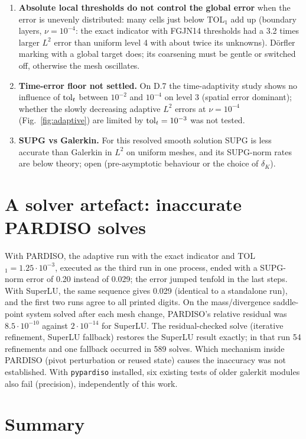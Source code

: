 \documentclass[11pt,a4paper]{article}
\newcommand{\code}[1]{\texttt{#1}}
\begin{document}
\begin{enumerate}
  level 6 in both norms with fewer unknowns (Sect.~\ref{sec:layers}).
\item \textbf{Absolute local thresholds do not control the global error} when the error is unevenly distributed: many cells
  just below TOL$_1$ add up (boundary layers, $\nu=10^{-4}$: the exact indicator with FGJN14 thresholds had a 3.2 times larger
  $L^2$ error than uniform level 4 with about twice its unknowns). D\"orfler marking with a global target does; its coarsening must be
  gentle or switched off, otherwise the mesh oscillates.
\item \textbf{Time-error floor not settled.} On D.7 the time-adaptivity study shows no influence of ${\rm tol}_t$ between
  $10^{-2}$ and $10^{-4}$ on level 3 (spatial error dominant); whether the slowly decreasing adaptive $L^2$ errors at
  $\nu=10^{-4}$ (Fig.~\ref{fig:adaptive}) are limited by ${\rm tol}_t=10^{-3}$ was not tested.
\item \textbf{SUPG vs Galerkin.} For this resolved smooth solution SUPG is less accurate than Galerkin in $L^2$
  on uniform meshes, and its SUPG-norm rates are below theory; open (pre-asymptotic behaviour or the choice of $\delta_K$).
\end{enumerate}

\section{A solver artefact: inaccurate PARDISO solves}\label{sec:pardiso}

With PARDISO, the adaptive run with the exact indicator and TOL$_1=1.25\cdot10^{-3}$, executed as the third run in one
process, ended with a SUPG-norm error of 0.20 instead of 0.029; the error jumped tenfold in the last steps. With SuperLU,
the same sequence gives 0.029 (identical to a standalone run), and the first two runs agree to all printed digits. On the
mass/divergence saddle-point system solved after each mesh change, PARDISO's relative residual was $8.5\cdot10^{-10}$
against $2\cdot10^{-14}$ for SuperLU. The residual-checked solve (iterative refinement, SuperLU fallback) restores the
SuperLU result exactly; in that run 54 refinements and one fallback occurred in 589 solves. Which mechanism inside PARDISO
(pivot perturbation or reused state) causes the inaccuracy was not established. With \code{pypardiso} installed, six
existing tests of older galerkit modules also fail (precision), independently of this work.

\section{Summary}
\end{document}
